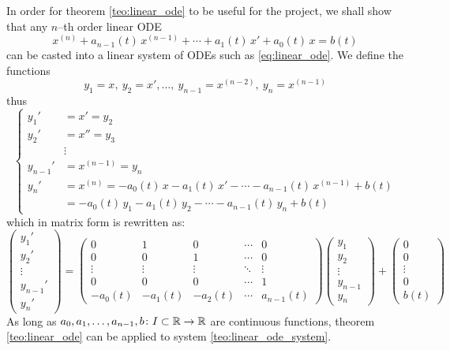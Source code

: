 In order for theorem \ref{teo:linear_ode} to be useful for the project, we
shall show that any $n$--th order linear ODE
\begin{equation*}
	x^{(n)} + a_{n-1}(t) \, x^{(n-1)} + \cdots + a_1(t) \, x' + a_0(t) \, x = b(t) 
\end{equation*}
can be casted into a linear system of ODEs such as \eqref{eq:linear_ode}. We
define the functions
\begin{equation*}
	y_1 = x, \ y_2 = x', \ldots, \ y_{n-1} = x^{(n-2)}, \ y_n = x^{(n-1)}
\end{equation*}
thus
\begin{equation*}
	\left\{
		\begin{aligned}
			y_1' &= x' = y_2 \\
			y_2' &= x'' = y_3 \\
			&\vdots \\
			y_{n-1}' &= x^{(n-1)} = y_n \\
			y_n' &= x^{(n)} = -a_0(t) \, x - a_1(t) \, x' - \cdots - a_{n-1}(t) \, x^{(n-1)} + b(t) \\
			&= -a_0(t) \, y_1 - a_1(t) \, y_2 - \cdots - a_{n-1}(t) \, y_n + b(t)
		\end{aligned}
	\right.
\end{equation*}
which in matrix form is rewritten as:
\begin{equation} \label{teo:linear_ode_system}
	\begin{pmatrix}
		y_1' \\ y_2' \\ \vdots \\ y_{n-1}' \\ y_n'
	\end{pmatrix} = 
	\begin{pmatrix}
		0 & 1 & 0 & \cdots & 0 \\
		0 & 0 & 1 & \cdots & 0 \\
		\vdots & \vdots & \vdots & \ddots & \vdots \\
		0 & 0 & 0 & \cdots & 1 \\
		-a_0(t) & -a_1(t) & -a_2(t) & \cdots & a_{n-1}(t)
	\end{pmatrix}
	\begin{pmatrix}
		y_1 \\ y_2 \\ \vdots \\ y_{n-1} \\ y_n
	\end{pmatrix} + 
	\begin{pmatrix}
		0 \\ 0 \\ \vdots \\ 0 \\ b(t)
	\end{pmatrix}
\end{equation}
As long as $a_0, a_1, \ldots, a_{n-1}, b \colon I \subset \mathbb{R} \to \mathbb{R}$ are
continuous functions, theorem \ref{teo:linear_ode} can be applied to system
\eqref{teo:linear_ode_system}.


